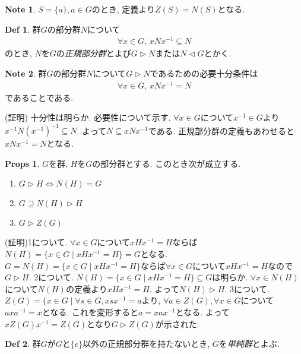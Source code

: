\documentclass[dvipdfmx]{jsarticle}
\theoremstyle{definition}
\newtheorem{props}{Props}
\newtheorem{definition}{Def}
\newtheorem{note}{Note}
\numberwithin{equation}{section}
\numberwithin{props}{section}
\numberwithin{definition}{section}
\numberwithin{note}{section}
\begin{document}
\begin{note}
     $S=\lbrace a\rbrace,  a \in G$のとき, 定義より$Z(S)=N(S)$となる.
\end{note}
\begin{definition}
     群$G$の部分群$N$について
     \begin{align}
          \forall x \in G,\, xNx^{-1}\subseteq N
     \end{align}
     のとき, $N$を$G$の\emph{正規部分群}とよび$G\rhd N$または$N \lhd G$とかく.
\end{definition}
\begin{note}
     群$G$の部分群$N$について$G\rhd N$であるための必要十分条件は
     \begin{align}
          \forall x \in G,\, xNx^{-1}=N
     \end{align}
     であることである.
\end{note}
(証明) 十分性は明らか. 必要性について示す.
$\forall x \in G$について$x^{-1}\in G$より$x^{-1}N(x^{-1})^{-1}\subseteq N$. よって$N\subseteq xNx^{-1}$である. 正規部分群の定義もあわせると$xNx^{-1}=N$となる.
\begin{props}
     $G$を群, $H$を$G$の部分群とする. このとき次が成立する.
     \begin{enumerate}
          \item $G\rhd H\iff N(H)=G$
          \item $G\supseteq N(H)\rhd H$
          \item $G\rhd Z(G)$
     \end{enumerate}
\end{props}
(証明)1について. $\forall x \in G$について$xHx^{-1}=H$ならば$N(H)=\lbrace x\in G\mid xHx^{-1}=H\rbrace=G$となる. $G=N(H)=\lbrace x\in G\mid xHx^{-1}=H\rbrace$ならば$\forall x\in G$について$xHx^{-1}=H$なので$G\rhd H$.
2について. $N(H)=\lbrace x\in G\mid xHx^{-1}=H\rbrace \subseteq G$は明らか. $\forall x \in N(H)$について$N(H)$の定義より$xHx^{-1}=H$. よって$N(H)\rhd H$.
3について. $Z(G)=\lbrace x\in G\mid \forall s\in G, xsx^{-1}=a$より, $\forall a\in Z(G),\forall x \in G$について$axa^{-1}=x$となる. これを変形すると$a=xax^{-1}$となる. よって$xZ(G)x^{-1}=Z(G)$となり$G\rhd Z(G)$が示された.
\begin{definition}
     群$G$が$G$と$\lbrace e\rbrace$以外の正規部分群を持たないとき, $G$を\emph{単純群}とよぶ.
\end{definition}
\end{document}
